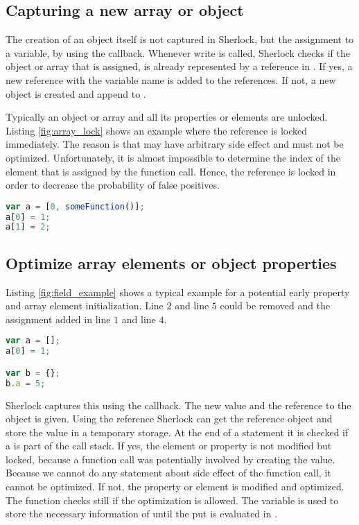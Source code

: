 \subsection{Capturing a new array or object}
The creation of an object itself is not captured in Sherlock, but the assignment to a variable, by using the  callback. Whenever write is called, Sherlock checks if the object or array that is assigned, is already represented by a reference in . If yes, a new reference with the variable name is added to the references. If not, a new  object is created and append to .

Typically an object or array and all its properties or elements are unlocked. Listing \ref{fig:array_lock} shows an example where the reference is locked immediately. The reason is that  may have arbitrary side effect and must not be optimized. Unfortunately, it is almost impossible to determine the index of the element that is assigned by the function call. Hence, the reference is locked in order to decrease the probability of false positives.

\begin{lstlisting}[caption={Example for an array that is immediately locked after creation. Neither index \js{0} nor index \js{1} is optimized.},language=Javascript,label=fig:array_lock]
var a = [0, someFunction()];
a[0] = 1;
a[1] = 2;
\end{lstlisting}

\subsection{Optimize array elements or object properties}
Listing \ref{fig:field_example} shows a typical example for a potential early property and array element initialization. Line $2$ and line $5$ could be removed and the assignment added in line $1$ and line $4$.

\begin{lstlisting}[caption={Example for a typical potential early property and array element initialization},label={fig:field_example},language=Javascript]
var a = [];
a[0] = 1;

var b = {};
b.a = 5;
\end{lstlisting}

Sherlock captures this using the  callback. The new value and the reference to the object is given. Using the reference Sherlock can get the reference object and store the value in a temporary storage. At the end of a statement it is checked if a  is part of the call stack. If yes, the element or property is not modified but locked, because a function call was potentially involved by creating the value. Because we cannot do any statement about side effect of the function call, it cannot be optimized. If not, the property or element is modified and optimized. The  function checks still if the optimization is allowed. The variable  is used to store the necessary information of  until the put is evaluated in .


